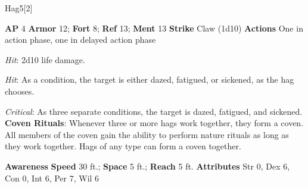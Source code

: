 \begin{monsection}[Green]{Hag}{5}[2]
\vspace{-1em}\vspace{-1em}
\begin{spellcontent}
\begin{spelltargetinginfo}
{\textbf{AP} 4}
\pari \textbf{Armor} 12;
\textbf{Fort} 8;
\textbf{Ref} 13;
\textbf{Ment} 13
\pari \textbf{Strike} Claw  (1d10)
\pari \textbf{Actions} One in action phase, one in delayed action phase
\end{spelltargetinginfo}
\begin{spelleffects}
\pari
{}
\par
\par \textit{Hit}: 2d10 life damage.
\vspace{0.5em}
\pari
{}
\par
\par \textit{Hit}:
As a condition, the target is either dazed, fatigued, or sickened, as the hag chooses.
\par \textit{Critical}: As three separate conditions, the target is dazed, fatigued, and sickened.
\vspace{0.5em}
\pari
\textbf{Coven Rituals}:
Whenever three or more hags work together, they form a coven.
All members of the coven gain the ability to perform nature rituals as long as they work together.
Hags of any type can form a coven together.
\end{spelleffects}
\end{spellcontent}
\begin{spellsubcontent}
\begin{spellfooter}
\pari \textbf{Awareness} 
\pari \textbf{Speed} 30 ft.;
\textbf{Space} 5 ft.;
\textbf{Reach} 5 ft.
\pari \textbf{Attributes}
Str 0,
Dex 6,
Con 0,
Int 6,
Per 7,
Wil 6
\end{spellfooter}
\end{spellsubcontent}
\end{monsection}
